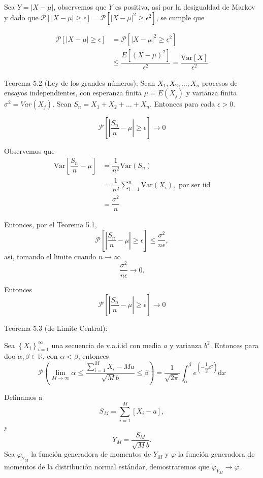 \documentclass[
  letterpaper,
  DIV=11,
  numbers=noendperiod]{scrreprt}
\begin{document}
Sea \(Y=\left|X-\mu\right|\), observemos que \(Y\) es positiva, así por
la desigualdad de Markov y dado que
\(\mathcal{P}\left[\left|X-\mu\right|\geq\epsilon\right] =\mathcal{P}\left[\left|X-\mu\right|^{2}\geq\epsilon^{2}\right]\),
se cumple que

\begin{align*}
\mathcal{P}\left[\left|X-\mu\right|\geq\epsilon\right] & =\mathcal{P}\left[\left|X-\mu\right|^{2}\geq\epsilon^{2}\right]\\
& \leq\dfrac{E\left[\left(X-\mu\right)^{2}\right]}{\epsilon^{2}}=\dfrac{\text{Var}\left[X\right]}{\epsilon^{2}}
\end{align*}

Teorema 5.2 (Ley de los grandes números): Sean
\(X_{1},X_{2},\dots, X_{n}\) procesos de ensayos independientes, con
esperanza finita \(\mu=E(X_{j})\) y varianza finita
\(\sigma^{2}=Var(X_{j})\). Sean \(S_{n}=X_{1}+X_{2}+\ldots+X_{n}\).
Entonces para cada \(\epsilon>0\).

\[
\mathcal{P}\left[\left|\dfrac{S_{n}}{n}-\mu\right|\geq\epsilon\right]\to0
\]

Observemos que \begin{align*}
\text{Var}\left[\dfrac{S_{n}}{n}-\mu\right] & =\dfrac{1}{n^{2}}\text{Var}\left(S_{n}\right)\\
& =\dfrac{1}{n^{2}}\sum_{i=1}^{n}\text{Var}\left(X_{i}\right),\text{ por ser iid}\\
& =\dfrac{\sigma^{2}}{n}
\end{align*}

Entonces, por el Teorema 5.1, \[
\mathcal{P}\left[\left|\dfrac{S_{n}}{n}-\mu\right|\geq\epsilon\right]\leq\dfrac{\sigma^{2}}{n\epsilon},
\] así, tomando el limite cuando \(n\to\infty\) \[
\dfrac{\sigma^{2}}{n\epsilon}\to0.
\]

Entonces \[
\mathcal{P}\left[\left|\dfrac{S_{n}}{n}-\mu\right|\geq\epsilon\right]\to0
\]

Teorema 5.3 (de Limite Central):

Sea \(\left\{ X_{i}\right\} _{i=1}^{\infty}\) una secuencia de v.a.i.id
con media \(a\) y varianza \(b^{2}\). Entonces para doo
\(\alpha,\beta\in\mathbb{R}\), con \(\alpha<\beta\), entonces \[
\mathcal{P}\left(\lim_{M\to\infty}\alpha\le\dfrac{{\displaystyle \sum_{i=1}^{M}}X_{i}-Ma}{\sqrt{M}b}\leq\beta\right)=\dfrac{1}{\sqrt{2\pi}}\int_{\alpha}^{\beta}e^{\left(-\dfrac{1}{2}x^{2}\right)}\mathrm{d}x
\]

Definamos a \[
S_{M}={\displaystyle \sum_{i=1}^{M}}\left[X_{i}-a\right],
\] y \[
Y_{M}=\dfrac{S_{M}}{\sqrt{M}b}.
\] Sea \(\varphi_{Y_{M}}\) la función generadora de momentos de
\(Y_{M}\) y \(\varphi\) la función generadora de momentos de la
distribución normal estándar, demostraremos que
\(\varphi_{Y_{M}}\to\varphi\).
\end{document}
